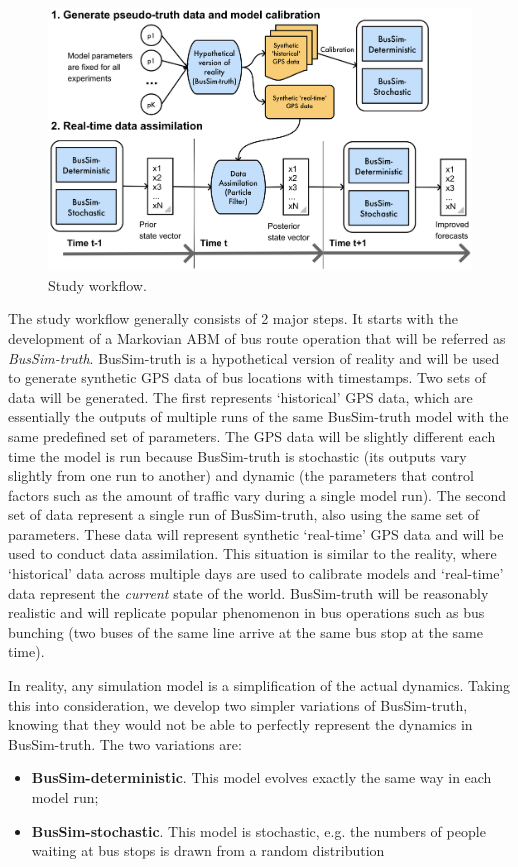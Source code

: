 \begin{figure}[H]  \centering\includegraphics[width=13cm]{Figures/bussim-framework.png}
\caption{Study workflow.} 
\label{fig:workflow} 
\end{figure}

The study workflow generally consists of 2 major steps. It starts with the development of a Markovian ABM of bus route operation that will be referred as \textit{BusSim-truth}. BusSim-truth is a hypothetical version of reality and will be used to generate synthetic GPS data of bus locations with timestamps. Two sets of data will be generated. The first represents `historical' GPS data, which are essentially the outputs of multiple runs of the same BusSim-truth model with the same predefined set of parameters. The GPS data will be slightly different each time the model is run because BusSim-truth is stochastic (its outputs vary slightly from one run to another) and dynamic (the parameters that control factors such as the amount of traffic vary during a single model run). The second set of data represent a single run of BusSim-truth, also using the same set of parameters. These data will represent synthetic `real-time' GPS data and will be used to conduct data assimilation. This situation is similar to the reality, where `historical' data across multiple days are used to calibrate models and `real-time' data represent the \textit{current} state of the world. BusSim-truth will be reasonably realistic and will replicate popular phenomenon in bus operations such as bus bunching (two buses of the same line arrive at the same bus stop at the same time). 

In reality, any simulation model is a simplification of the actual dynamics. Taking this into consideration, we develop two simpler variations of BusSim-truth, knowing that they would not be able to perfectly represent the dynamics in BusSim-truth.  The two variations are: 
\begin{itemize} 
	\item \textbf{BusSim-deterministic}. This model evolves exactly the same way in each model run;
	\item \textbf{BusSim-stochastic}. This model is stochastic, e.g. the numbers of people waiting at bus stops is drawn from a random distribution 
\end{itemize} 


